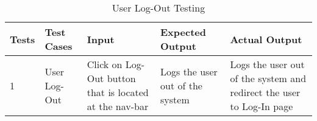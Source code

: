 \begin{table}[H]
    \caption{User Log-Out Testing}
        \label{}
    \begin{tabular}{|p{0.3in}|p{1.2in}|p{1.2in}|p{1.2in}|p{1in}|}
        \hline
        Tests & Test Cases & Input &Expected Output & Actual Output \\
        \hline
            1 &User Log-Out & Click on Log-Out button that is located at the nav-bar &Logs the user out of the system &Logs the user out of the system and redirect the user to Log-In page \\
            \hline
\end{tabular}
\end{table}


